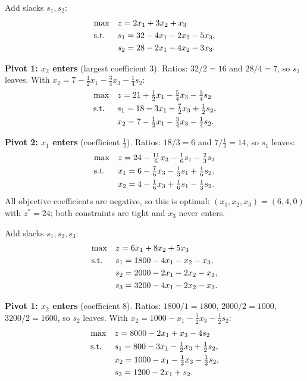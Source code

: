 
Add slacks $s_1, s_2$:
\[
\begin{aligned}
\max\quad & z = 2x_1 + 3x_2 + x_3 \\
\text{s.t.}\;\;\quad & s_1 = 32 - 4x_1 - 2x_2 - 5x_3, \\
& s_2 = 28 - 2x_1 - 4x_2 - 3x_3.
\end{aligned}
\]

\textbf{Pivot 1: $x_2$ enters} (largest coefficient $3$). Ratios:
$32/2 = 16$ and $28/4 = 7$, so $s_2$ leaves. With
$x_2 = 7 - \tfrac12 x_1 - \tfrac34 x_3 - \tfrac14 s_2$:
\[
\begin{aligned}
\max\quad & z = 21 + \tfrac12 x_1 - \tfrac54 x_3 - \tfrac34 s_2 \\
\text{s.t.}\;\;\quad & s_1 = 18 - 3x_1 - \tfrac72 x_3 + \tfrac12 s_2, \\
& x_2 = 7 - \tfrac12 x_1 - \tfrac34 x_3 - \tfrac14 s_2.
\end{aligned}
\]

\textbf{Pivot 2: $x_1$ enters} (coefficient $\tfrac12$). Ratios:
$18/3 = 6$ and $7/\tfrac12 = 14$, so $s_1$ leaves:
\[
\begin{aligned}
\max\quad & z = 24 - \tfrac{11}{6} x_3 - \tfrac16 s_1 - \tfrac23 s_2 \\
\text{s.t.}\;\;\quad & x_1 = 6 - \tfrac76 x_3 - \tfrac13 s_1 + \tfrac16 s_2, \\
& x_2 = 4 - \tfrac16 x_3 + \tfrac16 s_1 - \tfrac13 s_2.
\end{aligned}
\]
All objective coefficients are negative, so this is optimal:
$(x_1, x_2, x_3) = (6, 4, 0)$ with $z^* = 24$; both constraints are tight
and $x_3$ never enters.


Add slacks $s_1, s_2, s_3$:
\[
\begin{aligned}
\max\quad & z = 6x_1 + 8x_2 + 5x_3 \\
\text{s.t.}\;\;\quad & s_1 = 1800 - 4x_1 - x_2 - x_3, \\
& s_2 = 2000 - 2x_1 - 2x_2 - x_3, \\
& s_3 = 3200 - 4x_1 - 2x_2 - x_3.
\end{aligned}
\]

\textbf{Pivot 1: $x_2$ enters} (coefficient $8$). Ratios:
$1800/1 = 1800$, $2000/2 = 1000$, $3200/2 = 1600$, so $s_2$ leaves. With
$x_2 = 1000 - x_1 - \tfrac12 x_3 - \tfrac12 s_2$:
\[
\begin{aligned}
\max\quad & z = 8000 - 2x_1 + x_3 - 4s_2 \\
\text{s.t.}\;\;\quad & s_1 = 800 - 3x_1 - \tfrac12 x_3 + \tfrac12 s_2, \\
& x_2 = 1000 - x_1 - \tfrac12 x_3 - \tfrac12 s_2, \\
& s_3 = 1200 - 2x_1 + s_2.
\end{aligned}
\]

